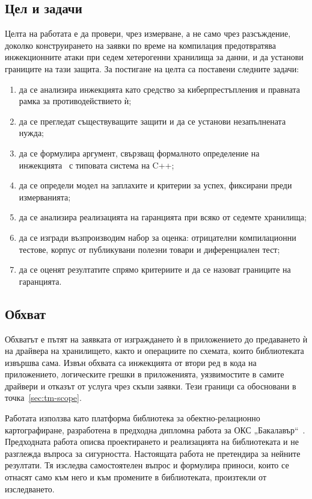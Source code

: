 \subsection*{Цел и задачи}

Целта на работата е да провери, чрез измерване, а не само чрез разсъждение,
доколко конструирането на заявки по време на компилация предотвратява
инжекционните атаки при седем хетерогенни хранилища за данни, и да установи
границите на тази защита. За постигане на целта са поставени следните задачи:

\begin{enumerate}
    \item да се анализира инжекцията като средство за киберпрестъпления и
          правната рамка за противодействието ѝ;
    \item да се прегледат съществуващите защити и да се установи незапълнената
          нужда;
    \item да се формулира аргумент, свързващ формалното определение на
          инжекцията~\cite{su2006essence} с типовата система на C++;
    \item да се определи модел на заплахите и критерии за успех, фиксирани преди
          измерванията;
    \item да се анализира реализацията на гаранцията при всяко от седемте
          хранилища;
    \item да се изгради възпроизводим набор за оценка: отрицателни компилационни
          тестове, корпус от публикувани полезни товари и диференциален тест;
    \item да се оценят резултатите спрямо критериите и да се назоват границите на
          гаранцията.
\end{enumerate}

\subsection*{Обхват}

Обхватът е пътят на заявката от изграждането ѝ в приложението до предаването ѝ
на драйвера на хранилището, както и операциите по схемата, които библиотеката
извършва сама. Извън обхвата са инжекцията от втори ред в кода на приложението,
логическите грешки в приложенията, уязвимостите в самите драйвери и
отказът от услуга чрез скъпи заявки. Тези граници са обосновани в
точка~\ref{sec:tm-scope}.

Работата използва като платформа библиотека за обектно-релационно
картографиране, разработена в предходна дипломна работа за ОКС
„Бакалавър“~\cite{tsvetanov2026orm}. Предходната работа описва проектирането и
реализацията на библиотеката и не разглежда въпроса за сигурността. Настоящата
работа не претендира за нейните резултати. Тя изследва самостоятелен въпрос и
формулира приноси, които се отнасят само към него и към промените в
библиотеката, произтекли от изследването.

